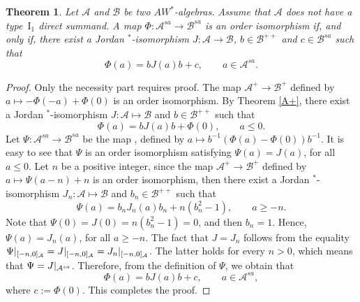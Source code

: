 \documentclass[12pt]{amsart}
\newtheorem{thm}{Theorem}[section]
\theoremstyle{definition}
\theoremstyle{remark}
\numberwithin{equation}{section}
\begin{document}
\begin{thm}\label{A^sa}
Let $\mathcal{A}$ and $\mathcal{B}$ be two $AW^*$-algebras.  Assume that $\mathcal{A}$ does not have a type~$\mathrm{I}_1$ direct summand. A map $\Phi:\mathcal{A}^{sa}\to\mathcal{B}^{sa}$ is an order isomorphism if, and only if, there exist a Jordan $^*$-isomorphism $J:\mathcal{A}\to \mathcal{B}$, $b\in\mathcal{B}^{++}$ and $c\in\mathcal{B}^{sa}$ such that $$\Phi(a)=bJ(a)b+c,\qquad a\in \mathcal{A}^{sa}.$$
\end{thm}
\begin{proof}
Only the necessity part requires proof. The map $\mathcal{A}^+\to \mathcal{B}^+$ defined by $a\mapsto -\Phi(-a)+\Phi(0)$ is an order isomorphism. By Theorem \ref{A+}, there exist a Jordan $^*$-isomorphism $J:\mathcal{A}\mapsto\mathcal{B}$ and $b\in\mathcal{B}^{++}$ such that 
$$\Phi(a)=bJ(a)b+ \Phi(0), \qquad a\leq 0.$$	
Let $\Psi:\mathcal{A}^{sa}\to\mathcal{B}^{sa}$ be the map , defined by $a\mapsto b^{-1}\left( \Phi(a)-\Phi(0)\right) b^{-1}$. It is easy to see that  $\Psi$ is an order isomorphism satisfying $\Psi(a)=J(a)$, for all $a\leq0$. Let $n$ be a positive integer,  since the	 map $\mathcal{A}^+\to \mathcal{B}^+$ defined by $a\mapsto \Psi(a-n)+n$ is an order isomorphism, then there exist a Jordan $^*$-isomorphism $J_n:\mathcal{A}\mapsto\mathcal{B}$ and $b_n\in\mathcal{B}^{++}$ such that $$\Psi(a)=b_nJ_n(a)b_n+ n(b_n^2-1), \qquad a\geq -n.$$
Note that $\Psi(0)=J(0)=n(b_n^2-1)=0$, and then $b_n=1$. Hence,  $\Psi(a)=J_n(a)$, for all $a\geq -n$. The fact that $J=J_n$ follows from the equality $\Psi\arrowvert_{[-n,0]_{\mathcal{A}}}= J\arrowvert_{[-n,0]_{\mathcal{A}}}=J_n\arrowvert_{[-n,0]_{\mathcal{A}}}$. The latter
holds for every $n>0$, which means that $\Psi=J\arrowvert_{\mathcal{A}^{sa}}$.  Therefore, from  the definition of $\Psi$, we obtain that $$\Phi(a)=bJ(a)b+c,\qquad a\in \mathcal{A}^{sa},$$ where $c:=\Phi(0)$. This completes the proof.	
\end{proof}
\end{document}
